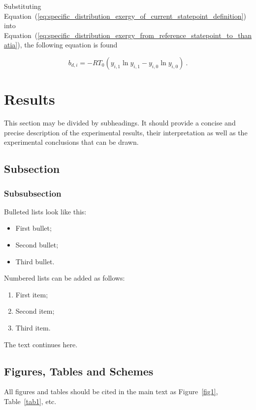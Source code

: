 \documentclass[journal,article,submit,pdftex,moreauthors]{Definitions/mdpi}
\begin{document}
Substituting Equation~(\ref{eq:specific_distribution_exergy_of_current_statepoint_definition}) into Equation~(\ref{eq:specific_distribution_exergy_from_reference_statepoint_to_thanatia}),
the following equation is found

\begin{equation} \label{eq:specific_distribution_exergy_from_statepoint_to_thanatia_definition}
  b_{d,i} = -RT_{0}(y_{i,1}\ln{y_{i,1}} - y_{i,0}\ln{y_{i,0}}) \ .
\end{equation}




\section{Results}

This section may be divided by subheadings. It should provide a concise and precise description of the experimental results, their interpretation as well as the experimental conclusions that can be drawn.
\subsection{Subsection}
\subsubsection{Subsubsection}

Bulleted lists look like this:
\begin{itemize}
\item	First bullet;
\item	Second bullet;
\item	Third bullet.
\end{itemize}

Numbered lists can be added as follows:
\begin{enumerate}
\item	First item;
\item	Second item;
\item	Third item.
\end{enumerate}

The text continues here.

\subsection{Figures, Tables and Schemes}

All figures and tables should be cited in the main text as Figure~\ref{fig1}, Table~\ref{tab1}, etc.
\end{document}
